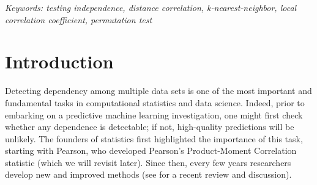 \documentclass[11pt]{article}
\begin{document}
\noindent%
{\it Keywords: testing independence, distance correlation, k-nearest-neighbor, local correlation coefficient, permutation test}
\vfill

\tableofcontents


\newpage
{}







\section{Introduction}

Detecting dependency among multiple data sets is one of the most important and fundamental tasks in computational statistics and data science. 
Indeed, prior to embarking on a predictive machine learning investigation, one might first check whether any dependence is detectable; if not, high-quality predictions will be unlikely.  
The founders of statistics first highlighted the importance of this task, starting with Pearson, who developed Pearson's Product-Moment Correlation statistic  \cite{Pearson1895} (which we will revisit later).  Since then, every few years researchers develop new and improved methods (see \cite{Reimherr2013} for a recent review and discussion).  
\end{document}

